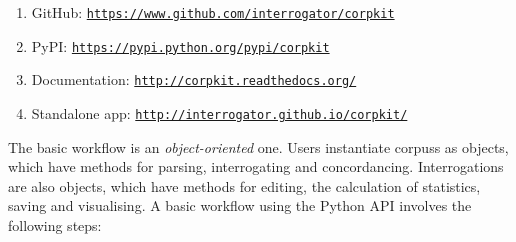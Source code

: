 \begin{enumerate}
    \item GitHub: \texttt{\href{https://www.github.com/interrogator/corpkit}{https://www.github.com/interrogator/corpkit}}
    \item PyPI: \texttt{\href{https://pypi.python.org/pypi/corpkit}{https://pypi.python.org/pypi/corpkit}}
    \item Documentation: \texttt{\href{http://corpkit.readthedocs.org/}{http://corpkit.readthedocs.org/}}
    \item Standalone app: \texttt{\href{http://interrogator.github.io/corpkit/}{http://interrogator.github.io/corpkit/}}
\end{enumerate} 
%
The basic workflow is an \emph{object\hyp{}oriented} one. Users instantiate \glspl{corpus} as objects, which have methods for parsing, interrogating and concordancing. Interrogations are also objects, which have methods for editing, the calculation of statistics, saving and visualising. A basic workflow using the Python \gls{API} involves the following steps:


